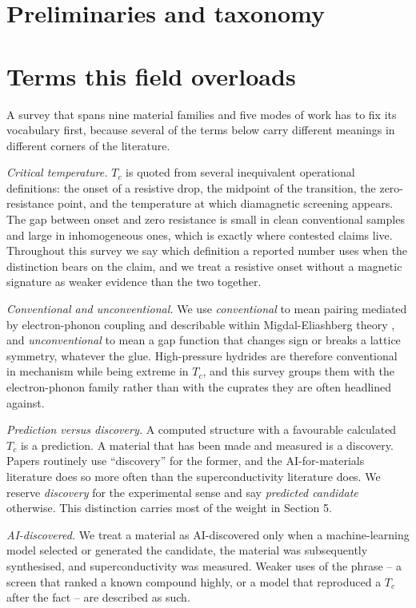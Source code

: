 \documentclass[
  11pt,
]{article}
\begin{document}
\section{Preliminaries and taxonomy}\label{preliminaries-and-taxonomy}

\section{Terms this field
overloads}\label{terms-this-field-overloads}

A survey that spans nine material families and five modes of work has to
fix its vocabulary first, because several of the terms below carry
different meanings in different corners of the literature.

\emph{Critical temperature.} \(T_c\) is quoted from several inequivalent
operational definitions: the onset of a resistive drop, the midpoint of
the transition, the zero-resistance point, and the temperature at which
diamagnetic screening appears. The gap between onset and zero resistance
is small in clean conventional samples and large in inhomogeneous ones,
which is exactly where contested claims live. Throughout this survey we
say which definition a reported number uses when the distinction bears
on the claim, and we treat a resistive onset without a magnetic
signature as weaker evidence than the two together.

\emph{Conventional and unconventional.} We use \emph{conventional} to
mean pairing mediated by electron-phonon coupling and describable within
Migdal-Eliashberg theory \citep{bardeen1957theory}, and
\emph{unconventional} to mean a gap function that changes sign or breaks
a lattice symmetry, whatever the glue. High-pressure hydrides are
therefore conventional in mechanism while being extreme in \(T_c\), and
this survey groups them with the electron-phonon family rather than with
the cuprates they are often headlined against.

\emph{Prediction versus discovery.} A computed structure with a
favourable calculated \(T_c\) is a prediction. A material that has been
made and measured is a discovery. Papers routinely use ``discovery'' for
the former, and the AI-for-materials literature does so more often than
the superconductivity literature does. We reserve \emph{discovery} for
the experimental sense and say \emph{predicted candidate} otherwise.
This distinction carries most of the weight in Section 5.

\emph{AI-discovered.} We treat a material as AI-discovered only when a
machine-learning model selected or generated the candidate, the material
was subsequently synthesised, and superconductivity was measured. Weaker
uses of the phrase -- a screen that ranked a known compound highly, or a
model that reproduced a \(T_c\) after the fact -- are described as such.
\end{document}
